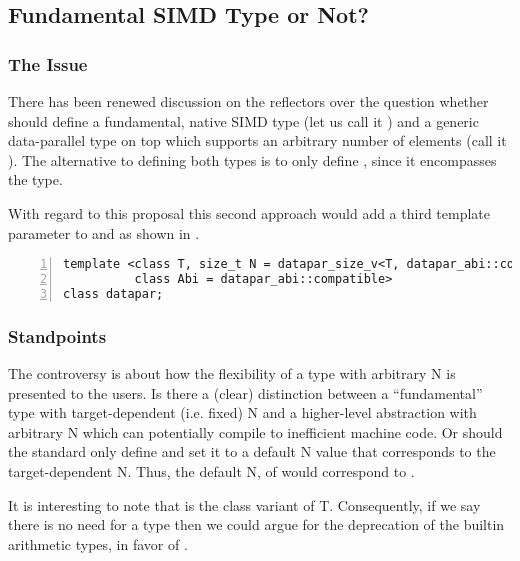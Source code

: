 \subsection{Fundamental SIMD Type or Not?}
\subsubsection{The Issue}
There has been renewed discussion on the reflectors over the question whether \CC{} should define a fundamental, native SIMD type (let us call it ) and a generic data-parallel type on top which supports an arbitrary number of elements (call it ).
The alternative to defining both types is to only define , since it encompasses the  type.

With regard to this proposal this second approach would add a third template parameter to \datapar and \mask as shown in .
\begin{lstlisting}[style=Vc,numbers=left,float,label=lst:datapar N,caption={
  Possible declaration of the class template parameters of a \datapar class with arbitrary width.
}]
template <class T, size_t N = datapar_size_v<T, datapar_abi::compatible>,
          class Abi = datapar_abi::compatible>
class datapar;
\end{lstlisting}

\subsubsection{Standpoints}
The controversy is about how the flexibility of a type with arbitrary \code N is presented to the users.
Is there a (clear) distinction between a “fundamental” type with target-dependent (i.e. fixed) \code N and a higher-level abstraction with arbitrary \code N which can potentially compile to inefficient machine code.
Or should the \CC{} standard only define  and set it to a default \code N value that corresponds to the target-dependent \code N.
Thus, the default \code N, of  would correspond to .

It is interesting to note that  is the class variant of \type T.
Consequently, if we say there is no need for a  type then we could argue for the deprecation of the builtin arithmetic types, in favor of . 

